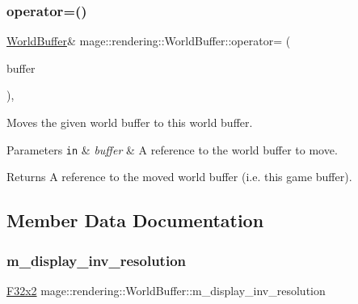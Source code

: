 \subsubsection{\texorpdfstring{operator=()}{operator=()}\hspace{0.1cm}{\footnotesize\ttfamily [2/2]}}
{\footnotesize\ttfamily \mbox{\hyperlink{structmage_1_1rendering_1_1_world_buffer}{World\+Buffer}}\& mage\+::rendering\+::\+World\+Buffer\+::operator= (\begin{DoxyParamCaption}\item[{\mbox{\hyperlink{structmage_1_1rendering_1_1_world_buffer}{World\+Buffer}} \&\&}]{buffer }\end{DoxyParamCaption})\hspace{0.3cm}{\ttfamily [default]}, {\ttfamily [noexcept]}}

Moves the given world buffer to this world buffer.


\begin{DoxyParams}[1]{Parameters}
\mbox{\tt in}  & {\em buffer} & A reference to the world buffer to move. \\
\hline
\end{DoxyParams}
\begin{DoxyReturn}{Returns}
A reference to the moved world buffer (i.\+e. this game buffer). 
\end{DoxyReturn}


\subsection{Member Data Documentation}
\mbox{\label{structmage_1_1rendering_1_1_world_buffer_a14b9521f67adaa823bdb9c45d833be1a}} 
\subsubsection{\texorpdfstring{m\+\_\+display\+\_\+inv\+\_\+resolution}{m\_display\_inv\_resolution}}
{\footnotesize\ttfamily \mbox{\hyperlink{namespacemage_a9dc0d34d6ecc87e4cfa4a826102117bc}{F32x2}} mage\+::rendering\+::\+World\+Buffer\+::m\+\_\+display\+\_\+inv\+\_\+resolution}

